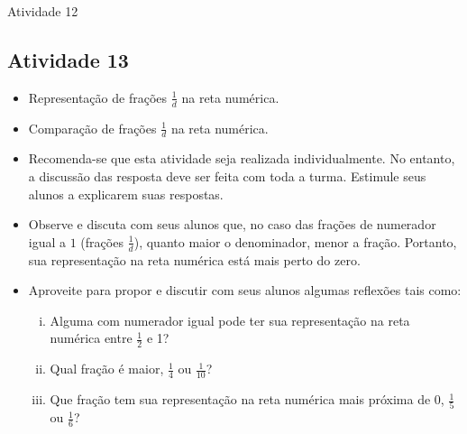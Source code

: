 \documentclass[oneside]{book}
\begin{document}
\begin{multicols}{2}
\begin{resposta*}{Atividade 12}


\end{resposta*}


\subsection{Atividade 13}


  \begin{itemize}
   \item Representação de frações $\frac{1}{d}$ na reta numérica.
   \item Comparação de frações $\frac{1}{d}$ na reta numérica.
  \end{itemize}
 

   \begin{itemize} 
    \item Recomenda-se que esta atividade seja realizada individualmente. No entanto, a discussão das resposta deve ser feita com toda a turma. Estimule seus alunos a explicarem suas respostas.
   \item  Observe e discuta com seus alunos que, no caso das frações de numerador igual a $1$ (frações $\frac{1}{d}$), quanto maior o denominador, menor a fração. Portanto, sua representação na reta numérica está mais perto do zero. 
   \item  Aproveite para propor e discutir com seus alunos algumas reflexões tais como: 
   \begin{enumerate}[(i)]
    \item Alguma com numerador igual pode ter sua representação na reta numérica entre $\frac{1}{2}$ e 1?
    \item Qual fração é maior, $\frac{1}{4}$ ou $\frac{1}{10}$?  
    \item Que fração tem sua representação na reta numérica mais próxima de 0, $\frac{1}{5}$ ou $\frac{1}{6}$?
   \end{enumerate}
 

\end{itemize}
\end{multicols}
\end{document}
